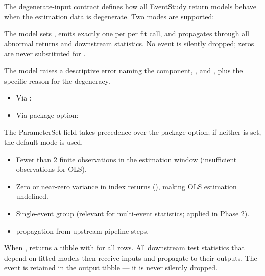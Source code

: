 \documentclass[a4paper]{book}
\begin{document}
\begin{Description}
The degenerate-input contract defines how all EventStudy return models
behave when the estimation data is degenerate. Two modes are supported:

 The model sets ,
emits exactly one  per 
per fit call, and propagates  through all abnormal returns
and downstream statistics. No event is silently dropped; zeros are
never substituted for .

 The model raises a descriptive  error
naming the component, , and , plus
the specific reason for the degeneracy.

\begin{itemize}

\item{} Via : 
\item{} Via package option: 

\end{itemize}

The ParameterSet field takes precedence over the package option; if
neither is set, the default  mode is used.

\begin{itemize}

\item{} Fewer than 2 finite observations in the estimation window
(insufficient observations for OLS).
\item{} Zero or near-zero variance in index returns
(), making OLS estimation undefined.
\item{} Single-event group (relevant for multi-event statistics;
applied in Phase 2).
\item{}  propagation from upstream pipeline steps.

\end{itemize}


When ,  returns
a tibble with  for all rows. All
downstream test statistics that depend on fitted models then receive
 inputs and propagate  to their outputs. The event
is retained in the output tibble — it is never silently dropped.
\end{Description}
\end{document}

